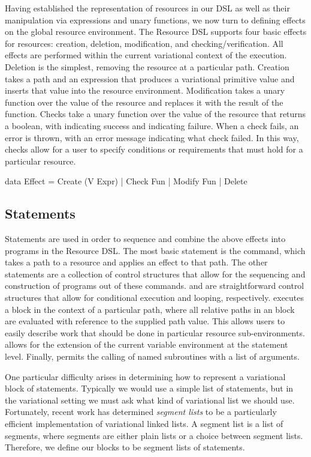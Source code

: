 \documentclass[letterpaper,10pt,onecolumn]{article}
\begin{document}
Having established the representation of resources in our DSL as well as their manipulation via expressions and unary functions,
we now turn to defining effects on the global resource environment.
The Resource DSL supports four basic effects for resources: creation, deletion, modification, and checking/verification. All effects are performed
within the current variational context of the execution. Deletion is the
simplest, removing the resource at a particular path. Creation takes a path and an expression that produces a variational primitive value
and inserts that value into the resource environment. Modification takes a unary function over the value of the resource and replaces it
with the result of the function. Checks take a unary function over the value of the resource that returns a boolean, with  indicating
success and  indicating failure. When a check fails, an error is thrown, with an error message indicating what check failed.
In this way, checks allow for a user to specify conditions or requirements that must hold for a particular resource.

\begin{program}
data Effect
     = Create (V Expr)
     | Check  Fun
     | Modify Fun
     | Delete
\end{program}

\subsection{Statements}

Statements are used in order to sequence and combine the above effects into programs in the Resource DSL.
The most basic statement is the  command, which takes a path to a resource and applies an effect to that
path. The other statements are a collection of control structures that allow for the sequencing and construction of
programs out of these  commands.  and  are straightforward control structures that allow
for conditional execution and looping, respectively.  executes a block in the context of a particular path, where all
relative paths in an  block are evaluated with reference to the supplied path value. This allows
users to easily describe work that should be done in particular resource sub-environments.  allows for the
extension of the current variable environment at the statement level. Finally,  permits the calling of named
subroutines with a list of arguments. 

One particular difficulty arises in determining how to represent a variational block of statements. Typically we
would use a simple list of statements, but in the variational setting we must ask what kind of variational list
we should use. Fortunately, recent work \cite{lists} has determined \emph{segment lists} to be a particularly
efficient implementation of variational linked lists. A segment list is a list of segments, where segments are either
plain lists or a choice between segment lists. Therefore, we define our blocks to be segment lists of
statements.
\end{document}
